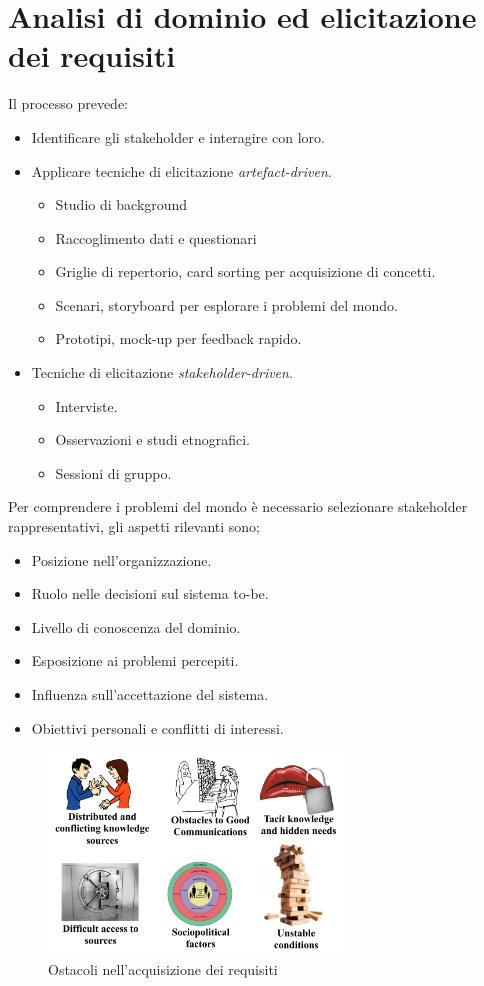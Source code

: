 \documentclass[../main.tex]{subfiles}
\begin{document}
\section{Analisi di dominio ed elicitazione dei requisiti}
Il processo prevede:
\begin{itemize}
	\item Identificare gli stakeholder e interagire con loro.
	\item Applicare tecniche di elicitazione \textit{artefact-driven}.
	\begin{itemize}
		\item Studio di background
		\item Raccoglimento dati e questionari
		\item Griglie di repertorio, card sorting per acquisizione di concetti.
		\item Scenari, storyboard per esplorare i problemi del mondo.
		\item Prototipi, mock-up per feedback rapido.
	\end{itemize}
	\item Tecniche di elicitazione \textit{stakeholder-driven}.
	\begin{itemize}
		\item Interviste.
		\item Osservazioni e studi etnografici.
		\item Sessioni di gruppo.
	\end{itemize}
\end{itemize}
Per comprendere i problemi del mondo è necessario selezionare stakeholder rappresentativi, gli aspetti rilevanti sono;
\begin{itemize}
	\item Posizione nell'organizzazione.
	\item Ruolo nelle decisioni sul sistema to-be.
	\item Livello di conoscenza del dominio.
	\item Esposizione ai problemi percepiti.
	\item Influenza sull'accettazione del sistema.
	\item Obiettivi personali e conflitti di interessi.
\end{itemize}
\begin{figure}[h]
	\centering
	\includegraphics[width=0.7\textwidth]{pictures/ostacoliAcquisizione.png}
	\caption{Ostacoli nell'acquisizione dei requisiti}
\end{figure}
\end{document}
